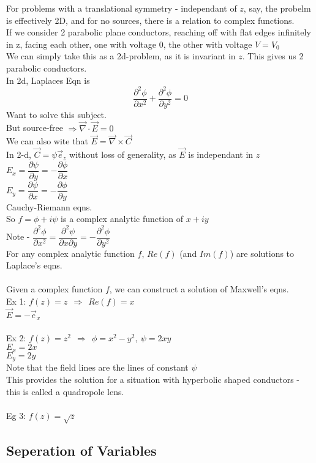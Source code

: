 \documentclass[a4paper,11pt]{article}
\newcommand{\pd}[2]{\dfrac{\partial #1}{\partial #2}}
\newcommand{\Nab}{\vec{\nabla}}
\newcommand{\dop}[2]{\vec{#1}\cdot\vec{#2}}
\begin{document}
For problems with a translational symmetry - independant of $z$, say, the probelm is effectively 2D, and for no sources, there is a relation to complex functions.\\
If we consider 2 parabolic plane conductors, reaching off with flat edges infinitely in z, facing each other, one with voltage 0, the other with voltage $V=V_0$\\
We can simply take this as a 2d-problem, as it is invariant in $z$. This gives us 2 parabolic conductors.\\
In 2d, Laplaces Eqn is
$$\pd{^2\phi}{x^2}+\pd{^2\phi}{y^2}=0$$
Want to solve this subject.\\
But source-free $\Rightarrow \dop{\nabla}{E}=0$\\
We can also wite that $\vec{E}=\Nab \times \vec{C}$\\
In 2-d, $\vec{C}=\psi \vec{e}_z$ without loss of generality, as $\vec{E}$ is independant in $z$\\
$E_x=\pd{\psi}{y}=-\pd{\phi}{x}$\\
$E_y=\pd{\psi}{x}=-\pd{\phi}{y}$\\
Cauchy-Riemann eqns.\\
So $f=\phi+i\psi$ is a complex analytic function of $x+iy$\\
Note - $\pd{^2\phi}{x^2}=\pd{^2\psi}{x\partial y}=-\pd{^2\phi}{y^2}$\\
For any complex analytic function $f$, $Re(f)$ (and $Im(f)$) are solutions to Laplace's eqns.\\
\\
Given a complex function $f$, we can construct a solution of Maxwell's eqns.\\
Ex 1: $f(z)=z~~\Rightarrow~~Re(f)=x$\\
$\vec{E}=-\vec{e}_x$\\
\\
Ex 2: $f(z)=z^2~~\Rightarrow~~\phi=x^2-y^2,~\psi=2xy$\\
$E_x=2x$\\
$E_y=2y$\\
Note that the field lines are the lines of constant $\psi$\\
This provides the solution for a situation with hyperbolic shaped conductors - this is called a quadropole lens.\\
\\
Eg 3: $f(z)=\sqrt{z}$\\

\subsection{Seperation of Variables}
\end{document}
